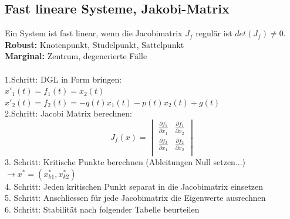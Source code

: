 \subsection{Fast lineare Systeme, Jakobi-Matrix}
Ein System ist fast linear, wenn die Jacobimatrix $J_f$ regulär ist $det(J_f)\neq 0$. \\
\textbf{Robust:} Knotenpunkt, Studelpunkt, Sattelpunkt \\
\textbf{Marginal:} Zentrum, degenerierte Fälle \\ \\
1.Schritt: DGL in Form bringen:\\ 
$x'_1(t) = f_1(t) = x_2(t)$\\
$x'_2(t) = f_2(t) = -q(t)x_1(t)-p(t)x_2(t)+g(t)$\\
2.Schritt: Jacobi Matrix berechnen:\\
\begin{equation*}
	J_f(x) =    
	\begin{vmatrix} 
	        \frac{\partial f_1}{\partial x_1} & \frac{\partial f_1}{\partial x_2}\\ 
	        \frac{\partial f_2}{\partial x_1} & \frac{\partial f_2}{\partial x_2}\\   
	\end{vmatrix}
\end{equation*}
3. Schritt: Kritische Punkte berechnen (Ableitungen Null setzen...) $\rightarrow x^* = (x_{k1}^*, x_{k2}^*)$\\
4. Schritt: Jeden kritischen Punkt separat in die Jacobimatrix einsetzen\\
5. Schritt: Anschliessen für jede Jacobimatrix die Eigenwerte ausrechnen \\
6. Schritt: Stabilität nach folgender Tabelle beurteilen\\